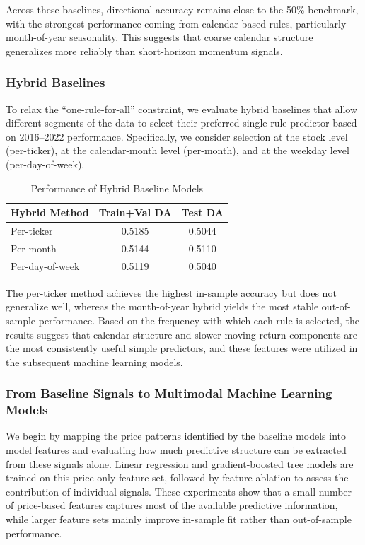 \documentclass[11pt]{article}
\begin{document}
\noindent Across these baselines, directional accuracy remains close to the 50\% benchmark, with the strongest performance coming from calendar-based rules, particularly month-of-year seasonality. 
This suggests that coarse calendar structure generalizes more reliably than short-horizon momentum signals.

\subsubsection*{Hybrid Baselines}
To relax the ``one-rule-for-all'' constraint, we evaluate hybrid baselines that allow different segments of the data to select their preferred single-rule predictor based on 2016--2022 performance. 
Specifically, we consider selection at the stock level (per-ticker), at the calendar-month level (per-month), and at the weekday level (per-day-of-week).

\begin{table}[H]
\centering
\begin{tabular}{lcc}
\toprule
\textbf{Hybrid Method} & \textbf{Train+Val DA} & \textbf{Test DA} \\
\midrule
Per-ticker        & 0.5185 & 0.5044 \\
Per-month         & 0.5144 & 0.5110 \\
Per-day-of-week   & 0.5119 & 0.5040 \\
\bottomrule
\end{tabular}
\caption{Performance of Hybrid Baseline Models}
\label{tab:hybrid_baselines}
\end{table}

\noindent The per-ticker method achieves the highest in-sample accuracy but does not generalize well, 
whereas the month-of-year hybrid yields the most stable out-of-sample performance.  
Based on the frequency with which each rule is selected, the results suggest that calendar structure and slower-moving return components are the most consistently useful simple predictors, 
and these features were utilized in the subsequent machine learning models.

\subsubsection{From Baseline Signals to Multimodal Machine Learning Models}

\noindent We begin by mapping the price patterns identified by the baseline models into model features and evaluating how much predictive structure can be extracted from these signals alone. 
Linear regression and gradient-boosted tree models are trained on this price-only feature set, followed by feature ablation to assess the contribution of individual signals. 
These experiments show that a small number of price-based features captures most of the available predictive information, while larger feature sets mainly improve in-sample fit rather than out-of-sample performance.
\end{document}

